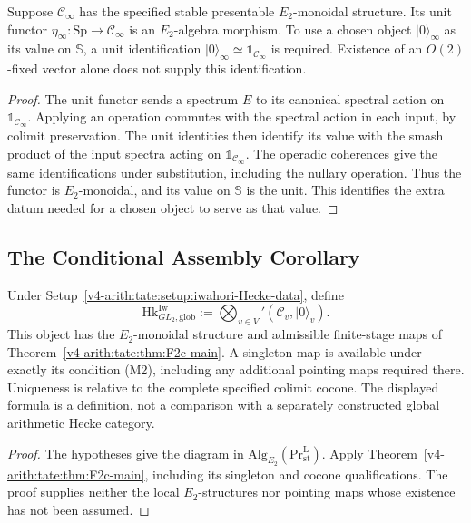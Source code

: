 \begin{lemma}
\label{v4-arith:tate:lem:iwahori-sph-arch}
Suppose \(\mathcal C_\infty\) has the specified stable presentable
\(E_2\)-monoidal structure. Its unit functor
\(\eta_\infty:\mathrm{Sp}\to\mathcal C_\infty\) is an
\(E_2\)-algebra morphism. To use a chosen object
\(|0\rangle_\infty\) as its value on \(\mathbb S\), a unit
identification \(|0\rangle_\infty\simeq\mathbb 1_{\mathcal C_\infty}\)
is required. Existence of an \(O(2)\)-fixed vector alone does not
supply this identification.
\end{lemma}

\begin{proof}
The unit functor sends a spectrum \(E\) to its canonical spectral
action on \(\mathbb 1_{\mathcal C_\infty}\). Applying an operation
commutes with the spectral action in each input, by colimit
preservation. The unit identities then identify its value with
the smash product of the input spectra acting on
\(\mathbb 1_{\mathcal C_\infty}\).
The operadic coherences give the same identifications under
substitution, including the nullary operation. Thus the functor
is \(E_2\)-monoidal, and its value on \(\mathbb S\) is the unit.
This identifies the extra datum needed for a chosen
object to serve as that value.
\end{proof}

\subsection{The Conditional Assembly Corollary}

\begin{corollary}
\label{v4-arith:tate:cor:F2-closed}
Under Setup~\ref{v4-arith:tate:setup:iwahori-Hecke-data}, define
\[
 \mathrm{Hk}^{\mathrm{Iw}}_{GL_2,\mathrm{glob}}
 :=\bigotimes_{v\in V}'(\mathcal C_v,|0\rangle_v).
\]
This object has the \(E_2\)-monoidal structure and admissible
finite-stage maps of
Theorem~\ref{v4-arith:tate:thm:F2c-main}. A singleton map is
available under exactly its condition (M2), including any
additional pointing maps required there. Uniqueness is relative
to the complete specified colimit cocone. The displayed formula
is a definition, not a comparison with a separately constructed
global arithmetic Hecke category.
\end{corollary}

\begin{proof}
The hypotheses give the diagram in
\(\mathrm{Alg}_{E_2}(\mathrm{Pr}^{\mathrm L}_{\mathrm{st}})\).
Apply Theorem~\ref{v4-arith:tate:thm:F2c-main}, including its
singleton and cocone qualifications. The proof supplies neither
the local \(E_2\)-structures nor pointing maps whose existence has
not been assumed.
\end{proof}

